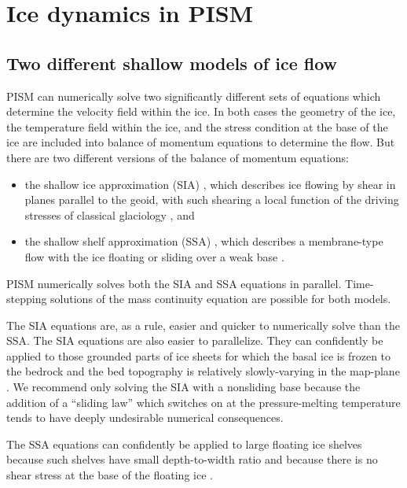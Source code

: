 \documentclass[11pt,final]{amsart}
\begin{document}
\clearpage
\newpage
\section{Ice dynamics in PISM}\label{sect:dynamics}

\subsection{Two different shallow models of ice flow}  PISM can numerically solve two significantly different sets of equations which determine the velocity field within the ice.  In both cases the geometry of the ice, the temperature field within the ice, and the stress condition at the base of the ice are included into balance of momentum equations to determine the flow.  But there are two different versions of the balance of momentum equations:\begin{itemize}
\item the shallow ice approximation (SIA) \cite{Hutter}, which describes ice flowing by shear in planes parallel to the geoid, with such shearing a local function of the driving stresses of classical glaciology \cite{Paterson}, and
\item the shallow shelf approximation (SSA) \cite{WeisGreveHutter}, which describes a membrane-type flow with the ice floating or sliding over a weak base \cite{Morland,MacAyeal,SchoofStream}.
\end{itemize}
PISM numerically solves both the SIA and SSA equations in parallel.  Time-stepping solutions of the mass continuity equation are possible for both models.

The SIA equations are, as a rule, easier and quicker to numerically solve than the SSA.  The SIA equations are also easier to parallelize.  They can confidently be applied to those grounded parts of ice sheets for which the basal ice is frozen to the bedrock and the bed topography is relatively slowly-varying in the map-plane \cite{Fowler}.  We recommend only solving the SIA with a nonsliding base because the addition of a ``sliding law'' which switches on at the pressure-melting temperature tends to have deeply undesirable numerical consequences.

The SSA equations can confidently be applied to large floating ice shelves because such shelves have small depth-to-width ratio and because there is no shear stress at the base of the floating ice \cite{Morland,MorlandZainuddin}.
\end{document}
